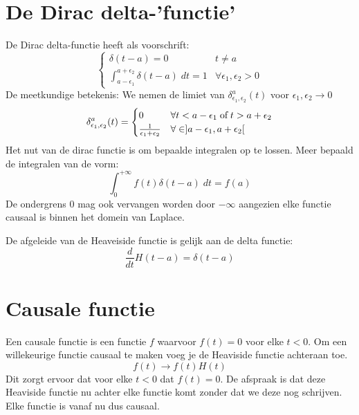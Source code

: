 \section{De Dirac delta-'functie'}
De Dirac delta-functie heeft als voorschrift:
$$
\begin{cases}
\delta(t - a) = 0 & t \neq a \\
\int_{a - \epsilon_1}^{a + \epsilon_2} \delta(t - a) \; dt = 1 & \forall \epsilon_1, \epsilon_2 > 0 
\end{cases}
$$
De meetkundige betekenis: We nemen de limiet van $\delta^a_{\epsilon_1,\epsilon_2}(t)$ voor $\epsilon_1,\epsilon_2 \rightarrow 0$
$$\delta^a_{\epsilon_1,\epsilon_2}(t) = \begin{cases}
                                        0 & \forall t < a - \epsilon_1 \; \hbox{of} \; t > a + \epsilon_2 \\
                                        \frac{1}{\epsilon_1 + \epsilon_2} & \forall \in ]a - \epsilon_1, a + \epsilon_2[
                                        \end{cases}
$$
Het nut van de dirac functie is om bepaalde integralen op te lossen. Meer bepaald de integralen van de vorm:
$$\int_{0}^{+\infty} f(t) \delta(t- a)\;dt = f(a)$$
De ondergrens 0 mag ook vervangen worden door $-\infty$ aangezien elke functie causaal is binnen het domein van Laplace.

De afgeleide van de Heaveiside functie is gelijk aan de delta functie:
$$\frac{d}{dt}H(t-a) = \delta(t - a)$$
\section{Causale functie}
Een causale functie is een functie $f$ waarvoor $f(t) = 0$ voor elke $t < 0$.
Om een willekeurige functie causaal te maken voeg je de Heaviside functie achteraan toe.
$$f(t) \rightarrow f(t)H(t)$$
Dit zorgt ervoor dat voor elke $t < 0$ dat $f(t) = 0$. De afspraak is dat deze Heaviside functie nu achter elke functie komt zonder dat we deze nog schrijven. Elke functie is vanaf nu dus causaal.

